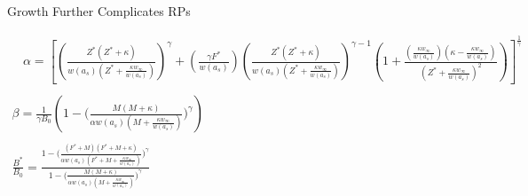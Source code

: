 \documentclass[ xcolor = pdftex, dvipsnames, table ]{beamer}
\newcommand{\kr}{ \frac{\kappa w_\infty}{w(a_s)} }
\newcommand{\one}{
        \left(\frac{Z(Z+\kappa)}{\alpha w(a_s)(Z+\kr)}\right)^\gamma
}
\newcommand{\two}{
        \left(\frac{\gamma F}{\alpha w(a_s)}\right) \left(\frac{Z(Z+\kappa)}{\alpha w(a_s)(Z+\kr)}\right)^{\gamma-1}
}
\newcommand{\thr}{
        \frac{\left(\kr\right)\left(\kappa-\kr\right)}{(Z+\kr)^2}
}
\newcommand{\oneA}{
        \left(\frac{Z^*(Z^*+\kappa)}{w(a_s)(Z^*+\kr)}\right)^\gamma
}
\newcommand{\twoA}{
        \left(\frac{\gamma F^*}{w(a_s)}\right) \left(\frac{Z^*(Z^*+\kappa)}{w(a_s)(Z^*+\kr)}\right)^{\gamma-1}
}
\newcommand{\thrA}{
        \frac{\left(\kr\right)\left(\kappa-\kr\right)}{(Z^*+\kr)^2}
}
\begin{document}
%
\begin{frame}{Growth Further Complicates RPs}


%
\begingroup
\tiny
\begin{gather*}
~~~~ \alpha  = \left[ \oneA + \twoA \left( 1 + \thrA \right) \right]^{\frac{1}{\gamma}} \label{aDelay}\\ ~\\
\beta = \frac{1}{\gamma B_0} \left( 1 - \Big(\frac{M (M + \kappa)}{\alpha w(a_s)(M + \kr)}\Big)^\gamma\right) \\ ~\\
\frac{B^*}{B_0} = \frac{ 1 - \Big(\frac{(F^* + M) (F^* + M + \kappa)}{\alpha w(a_s)(F^* + M + \kr)}\Big)^\gamma }{ 1 - \Big(\frac{M (M + \kappa)}{\alpha w(a_s)(M + \kr)}\Big)^\gamma }
\end{gather*}
\endgroup


\begin{center}
\end{center}

\end{frame}
\end{document}
